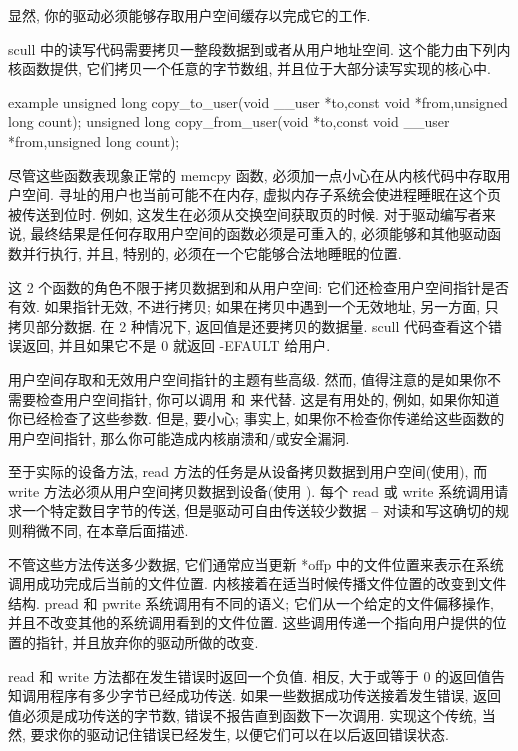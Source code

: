 \documentclass[lang=cn,newtx,10pt,scheme=chinese]{elegantbook}
\begin{document}
显然, 你的驱动必须能够存取用户空间缓存以完成它的工作.

scull 中的读写代码需要拷贝一整段数据到或者从用户地址空间. 这个能力由下列内核函数提供, 它们拷贝一个任意的字节数组, 并且位于大部分读写实现的核心中.

\begin{mycode}{example}
unsigned long copy_to_user(void __user *to,const void *from,unsigned long count);
unsigned long copy_from_user(void *to,const void __user *from,unsigned long count);
\end{mycode}

尽管这些函数表现象正常的 memcpy 函数, 必须加一点小心在从内核代码中存取用户空间. 寻址的用户也当前可能不在内存, 虚拟内存子系统会使进程睡眠在这个页被传送到位时. 例如, 这发生在必须从交换空间获取页的时候. 对于驱动编写者来说, 最终结果是任何存取用户空间的函数必须是可重入的, 必须能够和其他驱动函数并行执行, 并且, 特别的, 必须在一个它能够合法地睡眠的位置.

这 2 个函数的角色不限于拷贝数据到和从用户空间: 它们还检查用户空间指针是否有效. 如果指针无效, 不进行拷贝; 如果在拷贝中遇到一个无效地址, 另一方面, 只拷贝部分数据. 在 2 种情况下, 返回值是还要拷贝的数据量. scull 代码查看这个错误返回, 并且如果它不是 0 就返回 -EFAULT 给用户.

用户空间存取和无效用户空间指针的主题有些高级. 然而, 值得注意的是如果你不需要检查用户空间指针, 你可以调用  和
 来代替. 这是有用处的, 例如, 如果你知道你已经检查了这些参数. 但是, 要小心; 事实上, 如果你不检查你传递给这些函数的用户空间指针, 那么你可能造成内核崩溃和/或安全漏洞.

至于实际的设备方法, read 方法的任务是从设备拷贝数据到用户空间(使用), 而 write 方法必须从用户空间拷贝数据到设备(使用 ). 每个 read 或 write 系统调用请求一个特定数目字节的传送, 但是驱动可自由传送较少数据 -- 对读和写这确切的规则稍微不同, 在本章后面描述.

不管这些方法传送多少数据, 它们通常应当更新 *offp 中的文件位置来表示在系统调用成功完成后当前的文件位置. 内核接着在适当时候传播文件位置的改变到文件结构. pread 和 pwrite 系统调用有不同的语义; 它们从一个给定的文件偏移操作, 并且不改变其他的系统调用看到的文件位置. 这些调用传递一个指向用户提供的位置的指针, 并且放弃你的驱动所做的改变.

read 和 write 方法都在发生错误时返回一个负值. 相反, 大于或等于 0 的返回值告知调用程序有多少字节已经成功传送. 如果一些数据成功传送接着发生错误, 返回值必须是成功传送的字节数, 错误不报告直到函数下一次调用. 实现这个传统, 当然, 要求你的驱动记住错误已经发生, 以便它们可以在以后返回错误状态.
\end{document}
